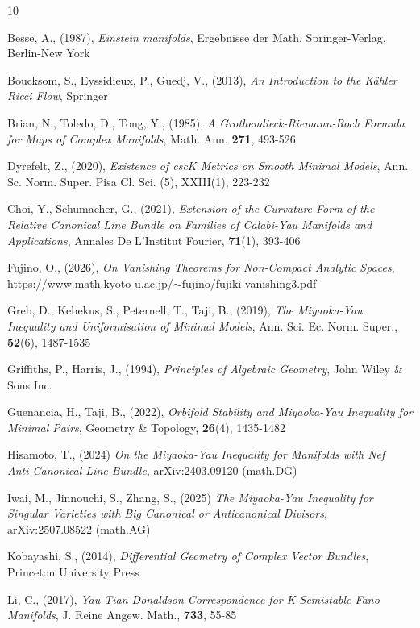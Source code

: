 \documentclass[12pt]{article}
\numberwithin{equation}{section}
\begin{document}
\begin{thebibliography}{10}




 Besse, A., (1987),
\textit{Einstein manifolds}, 
Ergebnisse der Math. Springer-Verlag, Berlin-New York

 Boucksom, S., Eyssidieux, P., Guedj, V., (2013), 
\textit{An Introduction to the K\"ahler Ricci Flow}, 
Springer

 Brian, N., Toledo, D., Tong, Y., (1985),
\textit{A Grothendieck-Riemann-Roch Formula for Maps of Complex Manifolds},
Math. Ann. \textbf{271}, 493-526

 Dyrefelt, Z., (2020),
\textit{Existence of cscK Metrics on Smooth Minimal Models},
Ann. Sc. Norm. Super. Pisa Cl. Sci. (5), XXIII(1), 223-232

 Choi, Y., Schumacher, G., (2021),
\textit{Extension of the Curvature Form of the Relative Canonical Line Bundle on Families of Calabi-Yau Manifolds and Applications},
Annales De L'Institut Fourier, \textbf{71}(1), 393-406

 Fujino, O., (2026),
\textit{On Vanishing Theorems for Non-Compact Analytic Spaces},
https://www.math.kyoto-u.ac.jp/{$\sim$}fujino/fujiki-vanishing3.pdf

 Greb, D., Kebekus, S., Peternell, T., Taji, B., (2019), \textit{The Miyaoka-Yau Inequality and Uniformisation of Minimal Models}, Ann. Sci. Ec. Norm. Super., \textbf{52}(6), 1487-1535

 Griffiths, P., Harris, J., (1994), 
\textit{Principles of Algebraic Geometry}, 
John Wiley \& Sons Inc.

 Guenancia, H., Taji, B., (2022),
\textit{Orbifold Stability and Miyaoka-Yau Inequality for Minimal Pairs},
Geometry \& Topology, \textbf{26}(4), 1435-1482

 Hisamoto, T., (2024)
\textit{On the Miyaoka-Yau Inequality for Manifolds with Nef Anti-Canonical Line Bundle}, 
arXiv:2403.09120 (math.DG)

 Iwai, M., Jinnouchi, S., Zhang, S., (2025) \textit{The Miyaoka-Yau Inequality for Singular Varieties with Big Canonical or Anticanonical Divisors}, 
arXiv:2507.08522 (math.AG)

 Kobayashi, S., (2014), 
\textit{Differential Geometry of Complex Vector Bundles}, 
Princeton University Press

 Li, C., (2017), 
\textit{Yau-Tian-Donaldson Correspondence for K-Semistable Fano Manifolds}, 
J. Reine Angew. Math., \textbf{733}, 55-85


\end{thebibliography}
\end{document}
